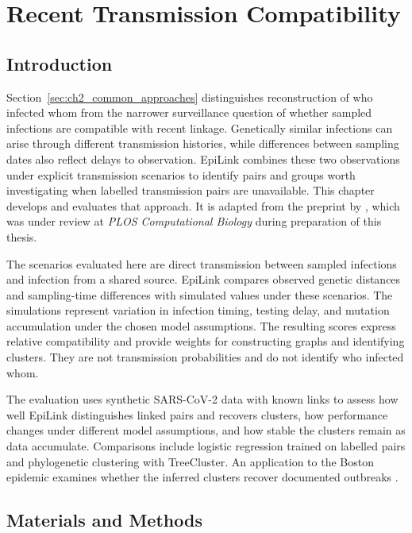 \chapter{Recent Transmission Compatibility}\label{ch:epilink}

\section{Introduction}\label{sec:ch3_introduction}

Section~\ref{sec:ch2_common_approaches} distinguishes reconstruction of who infected whom from the narrower surveillance question of whether sampled infections are compatible with recent linkage. Genetically similar infections can arise through different transmission histories, while differences between sampling dates also reflect delays to observation. EpiLink combines these two observations under explicit transmission scenarios to identify pairs and groups worth investigating when labelled transmission pairs are unavailable. This chapter develops and evaluates that approach. It is adapted from the preprint by \citet{Arthur2026}, which was under review at \textit{PLOS Computational Biology} during preparation of this thesis.

The scenarios evaluated here are direct transmission between sampled infections and infection from a shared source. EpiLink compares observed genetic distances and sampling-time differences with simulated values under these scenarios. The simulations represent variation in infection timing, testing delay, and mutation accumulation under the chosen model assumptions. The resulting scores express relative compatibility and provide weights for constructing graphs and identifying clusters. They are not transmission probabilities and do not identify who infected whom.

The evaluation uses synthetic SARS-CoV-2 data with known links to assess how well EpiLink distinguishes linked pairs and recovers clusters, how performance changes under different model assumptions, and how stable the clusters remain as data accumulate. Comparisons include logistic regression trained on labelled pairs and phylogenetic clustering with TreeCluster. An application to the Boston epidemic examines whether the inferred clusters recover documented outbreaks \citep{Lemieux2021}.

\section{Materials and Methods}\label{sec:ch3_methods}

